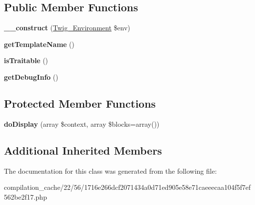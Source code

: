 \subsection*{Public Member Functions}
\begin{DoxyCompactItemize}
\item 
\hypertarget{class_____twig_template__22561716e266dcf2071434a0d71ed905e58e71caeeecaa104f5f7ef562be2f17_a4f8326243132c1450a81e0a817aa1be7}{}{\bfseries \+\_\+\+\_\+construct} (\hyperlink{class_twig___environment}{Twig\+\_\+\+Environment} \$env)\label{class_____twig_template__22561716e266dcf2071434a0d71ed905e58e71caeeecaa104f5f7ef562be2f17_a4f8326243132c1450a81e0a817aa1be7}

\item 
\hypertarget{class_____twig_template__22561716e266dcf2071434a0d71ed905e58e71caeeecaa104f5f7ef562be2f17_a621a3ccd148ed8b9e937da6959c98f39}{}{\bfseries get\+Template\+Name} ()\label{class_____twig_template__22561716e266dcf2071434a0d71ed905e58e71caeeecaa104f5f7ef562be2f17_a621a3ccd148ed8b9e937da6959c98f39}

\item 
\hypertarget{class_____twig_template__22561716e266dcf2071434a0d71ed905e58e71caeeecaa104f5f7ef562be2f17_aa9eb89be270f6afc256ef5e272b78a63}{}{\bfseries is\+Traitable} ()\label{class_____twig_template__22561716e266dcf2071434a0d71ed905e58e71caeeecaa104f5f7ef562be2f17_aa9eb89be270f6afc256ef5e272b78a63}

\item 
\hypertarget{class_____twig_template__22561716e266dcf2071434a0d71ed905e58e71caeeecaa104f5f7ef562be2f17_abd0ecb0136f4228db2bd963bfc1e20d7}{}{\bfseries get\+Debug\+Info} ()\label{class_____twig_template__22561716e266dcf2071434a0d71ed905e58e71caeeecaa104f5f7ef562be2f17_abd0ecb0136f4228db2bd963bfc1e20d7}

\end{DoxyCompactItemize}
\subsection*{Protected Member Functions}
\begin{DoxyCompactItemize}
\item 
\hypertarget{class_____twig_template__22561716e266dcf2071434a0d71ed905e58e71caeeecaa104f5f7ef562be2f17_adb62b7c226e07d30f836ed16158d924f}{}{\bfseries do\+Display} (array \$context, array \$blocks=array())\label{class_____twig_template__22561716e266dcf2071434a0d71ed905e58e71caeeecaa104f5f7ef562be2f17_adb62b7c226e07d30f836ed16158d924f}

\end{DoxyCompactItemize}
\subsection*{Additional Inherited Members}


The documentation for this class was generated from the following file\+:\begin{DoxyCompactItemize}
\item 
compilation\+\_\+cache/22/56/1716e266dcf2071434a0d71ed905e58e71caeeecaa104f5f7ef562be2f17.\+php\end{DoxyCompactItemize}
